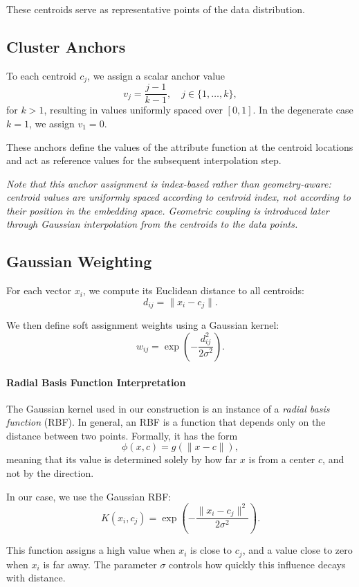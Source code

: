 These centroids serve as representative points of the data distribution.

\subsection{Cluster Anchors}

To each centroid $c_j$, we assign a scalar anchor value
\[
v_j = \frac{j-1}{k-1}, \quad j \in \{1,\dots,k\},
\]
for $k > 1$, resulting in values uniformly spaced over $[0,1]$. In the degenerate case $k=1$, we assign $v_1 = 0$.

These anchors define the values of the attribute function at the centroid locations and act as reference values for the subsequent interpolation step.

\medskip

\noindent
\textit{Note that this anchor assignment is index-based rather than geometry-aware: centroid values are uniformly spaced according to centroid index, not according to their position in the embedding space. Geometric coupling is introduced later through Gaussian interpolation from the centroids to the data points.}

\subsection{Gaussian Weighting}

For each vector $x_i$, we compute its Euclidean distance to all centroids:
\[
d_{ij} = \|x_i - c_j\|.
\]

We then define soft assignment weights using a Gaussian kernel:
\[
w_{ij} = \exp\left(-\frac{d_{ij}^2}{2\sigma^2}\right).
\]

\paragraph{Radial Basis Function Interpretation}

The Gaussian kernel used in our construction is an instance of a \emph{radial basis function} (RBF). In general, an RBF is a function that depends only on the distance between two points. Formally, it has the form
\[
\phi(x, c) = g(\|x - c\|),
\]
meaning that its value is determined solely by how far $x$ is from a center $c$, and not by the direction.

In our case, we use the Gaussian RBF:
\[
K(x_i, c_j) = \exp\left(-\frac{\|x_i - c_j\|^2}{2\sigma^2}\right).
\]

This function assigns a high value when $x_i$ is close to $c_j$, and a value close to zero when $x_i$ is far away. The parameter $\sigma$ controls how quickly this influence decays with distance.

